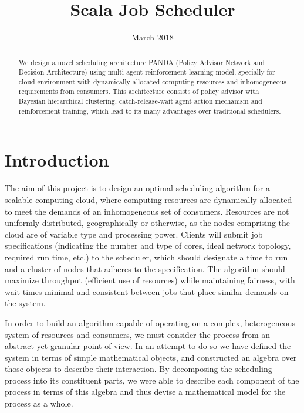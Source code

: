 \documentclass{article}
\title{Scala Job Scheduler}
\date{March 2018}
\theoremstyle{definition}
\theoremstyle{remark}
\begin{document}
	
	\maketitle
	
	\begin{abstract}
		We design a novel scheduling architecture PANDA (Policy Advisor Network and Decision Architecture) using
		multi-agent reinforcement learning model, specially for cloud environment with dynamically allocated computing
		resources and inhomogeneous requirements from consumers. This architecture consists of policy advisor with
		Bayesian hierarchical clustering, catch-release-wait agent action mechanism and reinforcement training,
		which lead to its many advantages over traditional schedulers.
	\end{abstract}
	
	\newpage
	\tableofcontents
	
	\newpage
	


	\section*{Introduction}

	\indent
	
	The aim of this project is to design an optimal scheduling algorithm for a scalable computing cloud, where
 	computing resources are dynamically allocated to meet the demands of an inhomogeneous set of consumers. Resources
 	are not uniformly distributed, geographically or otherwise, as the nodes comprising the cloud are of variable type
 	and processing power. Clients will submit job specifications (indicating the number and type of cores, ideal
	network topology, required run time, etc.) to the scheduler, which should designate a time to run and a cluster of
	nodes that adheres to the specification. The algorithm should maximize throughput (efficient use of resources)
	while maintaining fairness, with wait times minimal and consistent between jobs that place similar demands on the
	system.
	
	In order to build an algorithm capable of operating on a complex, heterogeneous system of resources and consumers,
	we must consider the process from an abstract yet granular point of view. In an attempt to do so we have defined
	the system in terms of simple mathematical objects, and constructed an algebra over those objects to describe
	their interaction. By decomposing the scheduling process into its constituent parts, we were able to describe
	each component of the process in terms of this algebra and thus devise a mathematical model for the process as a
	whole. 
	
\end{document}
